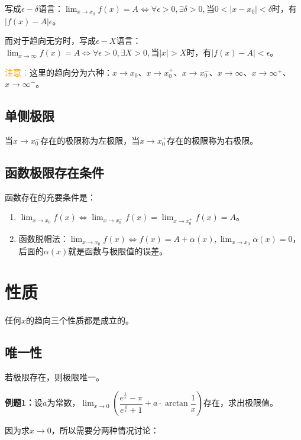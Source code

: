 \documentclass[UTF8]{ctexart}
\begin{document}
写成$\epsilon-\delta$语言：$\lim_{x\to x_0}f(x)=A\Leftrightarrow\forall\epsilon>0,\exists\delta>0,\text{当}0<\vert x-x_0\vert<\delta$时，有$\vert f(x)-A\vert\epsilon$。

而对于趋向无穷时，写成$\epsilon-X$语言：$\lim_{x\to\infty}f(x)=A\Leftrightarrow\forall\epsilon>0,\exists X>0,\text{当}\vert x\vert>X$时，有$\vert f(x)-A\vert<\epsilon$。

\textcolor{orange}{注意：}这里的趋向分为六种：$x\to x_0$、$x\to x_0^+$、$x\to x_0^-$、$x\to\infty$、$x\to\infty^+$、$x\to\infty^-$。

\subsection{单侧极限}

当$x\to x_0^-$存在的极限称为左极限，当$x\to x_0^+$存在的极限称为右极限。

\subsection{函数极限存在条件}

函数存在的充要条件是：

\begin{enumerate}
    \item $\lim_{x\to x_0}f(x)\Leftrightarrow\lim_{x\to x_0^-}f(x)=\lim_{x\to x_0^+}f(x)=A$。
    \item 函数脱帽法：$\lim_{x\to x_0}f(x)\Leftrightarrow f(x)=A+\alpha(x),\lim_{x\to x_0}\alpha(x)=0$，后面的$\alpha(x)$就是函数与极限值的误差。
\end{enumerate}

\section{性质}

任何$x$的趋向三个性质都是成立的。

\subsection{唯一性}

若极限存在，则极限唯一。

\textbf{例题1：}设$a$为常数，$\lim_{x\to 0}\left(\dfrac{e^{\frac{1}{x}}-\pi}{e^{\frac{2}{x}}+1}+a\cdot\arctan\dfrac{1}{x}\right)$存在，求出极限值。

因为求$x\to 0$，所以需要分两种情况讨论：
\end{document}
